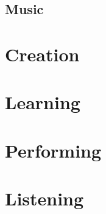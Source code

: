 \documentclass{book}
\begin{document}
\section{Music}

\chapter{Creation}

\chapter{Learning}

\chapter{Performing}

\chapter{Listening}
\end{document}
